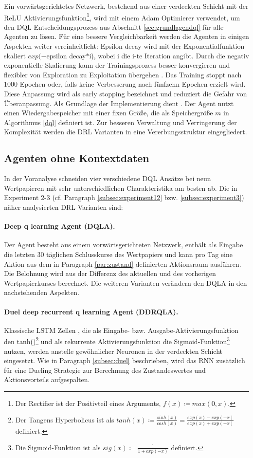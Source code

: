 Ein vorwärtsgerichtetes Netzwerk, bestehend aus einer verdeckten Schicht mit der ReLU Aktivierungsfunktion\footnote{Der Rectifier ist der Positivteil eines Arguments, $f(x)\coloneqq max(0,x)$.}, wird mit einem Adam Optimierer verwendet, um den \acs{DQL} Entscheidungsprozess aus Abschnitt \ref{sec:grundlagendql} für alle Agenten zu lösen.
Für eine bessere Vergleichbarkeit werden die Agenten in einigen Aspekten weiter vereinheitlicht:
Epsilon decay wird mit der Exponentialfunktion skaliert $exp(-$epsilon decay$*$i), wobei i die i-te Iteration angibt. Durch die negativ exponentielle Skalierung kann der Trainingsprozess besser konvergieren und flexibler von Exploration zu Exploitation übergehen \parencite{zamora2017extending}.
Das Training stoppt nach 1000 Epochen oder, falls keine Verbesserung nach fünfzehn Epochen erzielt wird. Diese Anpassung wird als early stopping bezeichnet und reduziert die Gefahr von Überanpassung. Als Grundlage der Implementierung dient \parencite{earlystopping}.
Der Agent nutzt einen Wiedergabespeicher mit einer fixen Größe, die als Speichergröße $m$ in Algorithmus \ref{dql} definiert ist.
Zur besseren Verwaltung und Verringerung der Komplexität werden die \acs{DRL} Varianten in eine Vererbungsstruktur eingegliedert.

\subsection{Agenten ohne Kontextdaten}

In der Voranalyse schneiden vier verschiedene \acs{DQL} Ansätze bei neun Wertpapieren mit sehr unterschiedlichen Charakteristika am besten ab. 
Die in Experiment 2-3 (cf. Paragraph \ref{subsec:experiment12} bzw. \ref{subsec:experiment3}) näher analysierten \acs{DRL} Varianten sind:
\paragraph{Deep q learning Agent (\acs{DQLA}).} Der Agent besteht aus einem vorwärtsgerichteten Netzwerk, enthält als Eingabe die letzten 30 täglichen Schlusskurse des Wertpapiers und kann pro Tag eine Aktion aus dem in Paragraph \ref{par:zustand} definierten Aktionsraum ausführen. Die Belohnung wird aus der Differenz des aktuellen und des vorherigen Wertpapierkurses berechnet. Die weiteren Varianten verändern den \acs{DQLA} in den nachstehenden Aspekten.
\paragraph{Duel deep recurrent q learning Agent (\acs{DDRQLA}).} Klassische \acs{LSTM} Zellen \parencite{hochre}, die als Eingabe- bzw. Ausgabe-Aktivierungsfunktion den tanh()\footnote{Der Tangens Hyperbolicus ist als $tanh(x)\coloneqq\frac{sinh(x)}{cosh(x)}=\frac{exp(x)-exp(-x)}{exp(x)+exp(-x)}$ definiert.} und als rekurrente Aktivierungsfunktion die Sigmoid-Funktion\footnote{Die Sigmoid-Funktion ist als $sig(x)\coloneqq\frac{1}{1+exp(-x)}$ definiert.} nutzen, werden anstelle gewöhnlicher Neuronen in der verdeckten Schicht eingesetzt.
Wie in Paragraph \ref{subsec:duel} beschrieben, wird das \acs{RNN} zusätzlich für eine Dueling Strategie zur Berechnung des Zustandeswertes und Aktionsvorteils aufgespalten.
